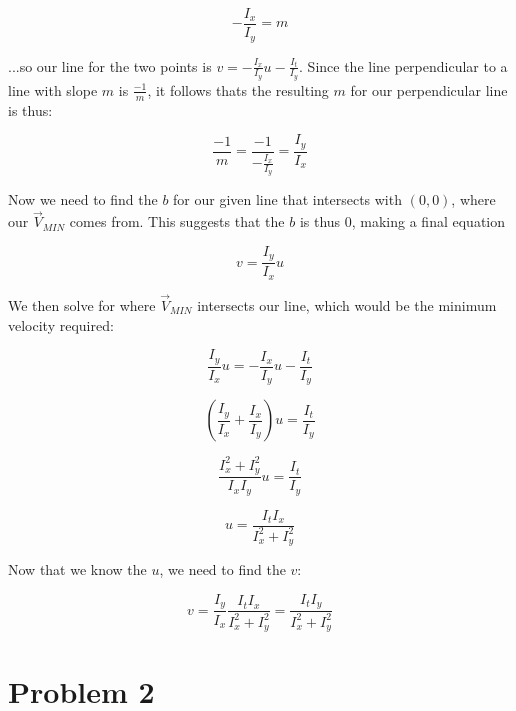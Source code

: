 \documentclass{article}
\begin{document}
\begin{equation}
    -\frac{I_x}{I_y} = m
\end{equation}

\noindent ...so our line for the two points is $v = -\frac{I_x}{I_y} u - \frac{I_t}{I_y}$. Since the line perpendicular to a line with slope $m$ is $\frac{-1}{m}$, it follows thats the resulting $m$ for our perpendicular line is thus:

\begin{equation}
    \frac{-1}{m} = \frac{-1}{-\frac{I_x}{I_y}} = \frac{I_y}{I_x}
\end{equation}

\noindent Now we need to find the $b$ for our given line that intersects with $(0,0)$, where our $\vec{V}_{MIN}$ comes from. This suggests that the $b$ is thus $0$, making a final equation

\begin{equation}
    v = \frac{I_y}{I_x} u
\end{equation}

\noindent We then solve for where $\vec{V}_{MIN}$ intersects our line, which would be the minimum velocity required:

\begin{equation}
    \frac{I_y}{I_x} u = -\frac{I_x}{I_y} u - \frac{I_t}{I_y}
\end{equation}

\begin{equation}
    (\frac{I_y}{I_x} + \frac{I_x}{I_y}) u = \frac{I_t}{I_y}
\end{equation}

\begin{equation}
    \frac{I_x^2 + I_y^2}{I_x I_y}u = \frac{I_t}{I_y}
\end{equation}

\begin{equation}
    u = \frac{I_t I_x}{I_x^2 + I_y^2}
\end{equation}

\noindent Now that we know the $u$, we need to find the $v$:

\begin{equation}
    v = \frac{I_y}{I_x} \frac{I_t I_x}{I_x^2 + I_y^2} = \frac{I_t I_y}{I_x^2 + I_y^2}
\end{equation}

\section*{Problem 2}
\end{document}
